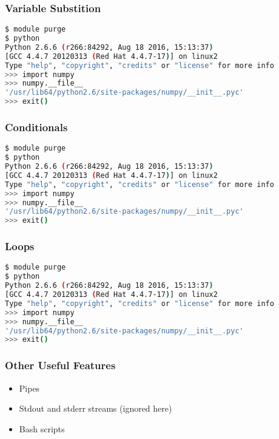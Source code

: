\documentclass{beamer}
\begin{document}
\begin{frame}[fragile]
\frametitle{Variable Substition}
\begingroup
\scriptsize
\begin{lstlisting}[backgroundcolor = \color{codegray}, language = Bash, showstringspaces=false]
$ module purge
$ python
Python 2.6.6 (r266:84292, Aug 18 2016, 15:13:37)
[GCC 4.4.7 20120313 (Red Hat 4.4.7-17)] on linux2
Type "help", "copyright", "credits" or "license" for more info
>>> import numpy
>>> numpy.__file__
'/usr/lib64/python2.6/site-packages/numpy/__init__.pyc'
>>> exit()
\end{lstlisting}
\endgroup
\end{frame}



\begin{frame}[fragile]
\frametitle{Conditionals}
\begingroup
\scriptsize
\begin{lstlisting}[backgroundcolor = \color{codegray}, language = Bash, showstringspaces=false]
$ module purge
$ python
Python 2.6.6 (r266:84292, Aug 18 2016, 15:13:37)
[GCC 4.4.7 20120313 (Red Hat 4.4.7-17)] on linux2
Type "help", "copyright", "credits" or "license" for more info
>>> import numpy
>>> numpy.__file__
'/usr/lib64/python2.6/site-packages/numpy/__init__.pyc'
>>> exit()
\end{lstlisting}
\endgroup
\end{frame}



\begin{frame}[fragile]
\frametitle{Loops}
\begingroup
\scriptsize
\begin{lstlisting}[backgroundcolor = \color{codegray}, language = Bash, showstringspaces=false]
$ module purge
$ python
Python 2.6.6 (r266:84292, Aug 18 2016, 15:13:37)
[GCC 4.4.7 20120313 (Red Hat 4.4.7-17)] on linux2
Type "help", "copyright", "credits" or "license" for more info
>>> import numpy
>>> numpy.__file__
'/usr/lib64/python2.6/site-packages/numpy/__init__.pyc'
>>> exit()
\end{lstlisting}
\endgroup
\end{frame}



\begin{frame}
\frametitle{Other Useful Features}
\begin{itemize}
    \item Pipes 
    \pause
    \item Stdout and stderr streams (ignored here)
    \pause
    \item Bash scripts
    \pause
\end{itemize}
\end{frame}
\end{document}
